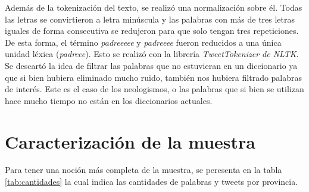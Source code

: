 Además de la tokenización del texto, se realizó una normalización sobre él. Todas las letras se convirtieron a letra minúscula y las palabras con más de tres letras iguales de forma consecutiva se redujeron para que solo tengan tres repeticiones. De esta forma, el término \textit{padreeeee} y \textit{padreeee} fueron reducidos a una única unidad léxica (\textit{padreee}). Esto se realizó con la librería \textit{TweetTokenizer de NLTK}. 
Se descartó la idea de filtrar las palabras que no estuvieran en un diccionario ya que si bien hubiera eliminado mucho ruido, también nos hubiera filtrado palabras de interés. Este es el caso de los neologismos, o las palabras que si bien se utilizan hace mucho tiempo no están en los diccionarios actuales.

\section{Caracterización de la muestra}

Para tener una noción más completa de la muestra, se peresenta en la tabla \ref{tab:cantidades} la cual indica las cantidades de palabras y tweets por provincia.


